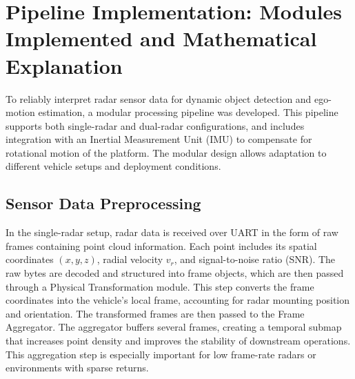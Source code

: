 \section{Pipeline Implementation: Modules Implemented and Mathematical Explanation}
\label{sec:Mathematical Models and Algorithms for Radar-Based Object Detection}

To reliably interpret radar sensor data for dynamic object detection and ego-motion estimation, a modular processing pipeline was developed. 
This pipeline supports both single-radar and dual-radar configurations, and includes integration with an Inertial Measurement Unit (IMU) to compensate for rotational motion of the platform. 
The modular design allows adaptation to different vehicle setups and deployment conditions.

\subsection*{Sensor Data Preprocessing}
In the single-radar setup, radar data is received over UART in the form of raw frames containing point cloud information. 
Each point includes its spatial coordinates $(x, y, z)$, radial velocity $v_r$, and signal-to-noise ratio (SNR). 
The raw bytes are decoded and structured into frame objects, which are then passed through a Physical Transformation module. 
This step converts the frame coordinates into the vehicle's local frame, accounting for radar mounting position and orientation. 
The transformed frames are then passed to the Frame Aggregator.
The aggregator buffers several frames, creating a temporal submap that increases point density and improves the stability of downstream operations. 
This aggregation step is especially important for low frame-rate radars or environments with sparse returns.

